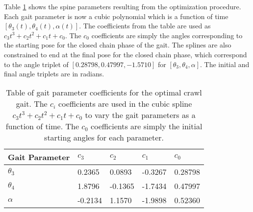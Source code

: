 


Table \ref{tab:optimal_parameters} shows the spine parameters resulting from the
optimization procedure. 
Each gait parameter is now a cubic polynomial which is a function of time $[\theta_3 (t), \theta_4 (t), \alpha (t)]$.
The coefficients from the table are used as $c_3 t^3 + c_2 t^2 + c_1 t + c_0$.
The $c_0$ coefficients are simply the angles corresponding to the starting pose for the closed chain phase
of the gait. The splines are also constrained to end at the final pose for the closed chain phase, which
correspond to the angle triplet of $[0.28798, 0.47997, -1.5710]$ for $[\theta_3, \theta_4, \alpha]$.
The initial and final angle triplets are in radians.

\begin{table}
  \centering
  \begin{tabularx}{0.75\textwidth}{|l|l|l|l|X|}
    \hline
    \textbf{Gait Parameter} & \textbf{$c_3$} & \textbf{$c_2$} & \textbf{$c_1$} & \textbf{$c_0$} \\  \hline\hline
    $\theta_3$              &   0.2365       &  0.0893        & -0.3267        &  0.28798       \\ 
    $\theta_4$              &   1.8796       & -0.1365        & -1.7434        &  0.47997       \\  
    $\alpha$                &  -0.2134       &  1.1570        & -1.9898        &  0.52360       \\  \hline
  \end{tabularx} 
  
  \caption{Table of gait parameter coefficients for the optimal crawl gait. 
           The $c_i$ coefficients are used in the cubic spline 
           $c_3 t^3 + c_2 t^2 + c_1 t + c_0$ to vary the gait parameters as a function of time.
           The $c_0$ coefficients are simply the initial starting angles for each parameter.}
  \label{tab:optimal_parameters}
\end{table}

